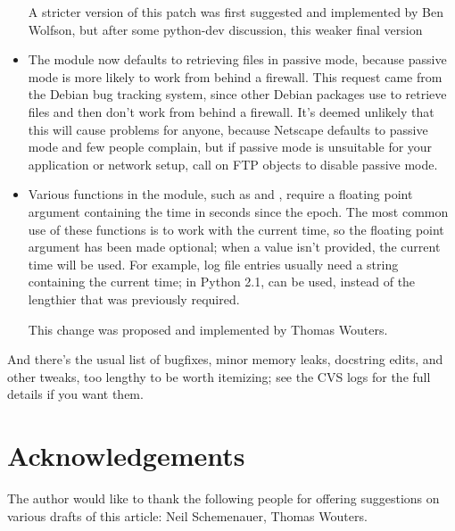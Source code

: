 \documentclass{howto}
\begin{document}
\begin{itemize}
A stricter version of this patch was first suggested and implemented
by Ben Wolfson, but after some python-dev discussion, this weaker final version 

\item The  module now defaults to retrieving files in passive mode,
because passive mode is more likely to work from behind a firewall.
This request came from the Debian bug tracking system, since other
Debian packages use  to retrieve files and then don't
work from behind a firewall.  It's deemed unlikely that this will
cause problems for anyone, because Netscape defaults to passive mode
and few people complain, but if passive mode is unsuitable for your
application or network setup, call
 on FTP objects to disable passive mode.  

\item Various functions in the  module, such as
 and ,
require a floating point argument containing the time in seconds since
the epoch.  The most common use of these functions is to work with the
current time, so the floating point argument has been made optional;
when a value isn't provided, the current time will be used.  For
example, log file entries usually need a string containing the current
time; in Python 2.1,  can be used, instead of the
lengthier  that was
previously required.
 
This change was proposed and implemented by Thomas Wouters.

\end{itemize}

And there's the usual list of bugfixes, minor memory leaks, docstring
edits, and other tweaks, too lengthy to be worth itemizing; see the
CVS logs for the full details if you want them.


\section{Acknowledgements}

The author would like to thank the following people for offering
suggestions on various drafts of this article: Neil Schemenauer,
Thomas Wouters.
\end{document}
